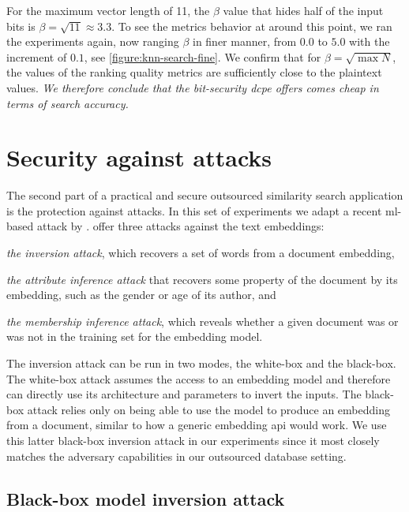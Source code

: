 				For the maximum vector length of 11, the $\beta$ value that hides half of the input bits is $\beta = \sqrt{11} \approx 3.3$.
				To see the metrics behavior at around this point, we ran the experiments again, now ranging $\beta$ in finer manner, from $0.0$ to $5.0$ with the increment of $0.1$, see \cref{figure:knn-search-fine}.
				We confirm that for $\beta = \sqrt{\max N}$, the values of the ranking quality metrics are sufficiently close to the plaintext values.
				\emph{We therefore conclude that the bit-security \acrshort{dcpe} offers comes cheap in terms of search accuracy.}

				

	\section{Security against attacks}\label{section:knn-snapshot:attacks}

		The second part of a practical and secure outsourced similarity search application is the protection against attacks.
		In this set of experiments we adapt a recent \acrshort{ml}-based attack by \textcite{embedding-attacks}.
		\textcite{embedding-attacks} offer three attacks against the text embeddings:
		\begin{enumerate*}[label={(\roman*)}]
			\item \emph{the inversion attack}, which recovers a set of words from a document embedding,
			\item \emph{the attribute inference attack} that recovers some property of the document by its embedding, such as the gender or age of its author, and
			\item \emph{the membership inference attack}, which reveals whether a given document was or was not in the training set for the embedding model.
		\end{enumerate*}
		The inversion attack can be run in two modes, the white-box and the black-box.
		The white-box attack assumes the access to an embedding model and therefore can directly use its architecture and parameters to invert the inputs.
		The black-box attack relies only on being able to use the model to produce an embedding from a document, similar to how a generic embedding \acrshort{api} would work.
		We use this latter black-box inversion attack in our experiments since it most closely matches the adversary capabilities in our outsourced database setting.

		\subsection{Black-box model inversion attack \texorpdfstring{\cite{embedding-attacks}}{}}

